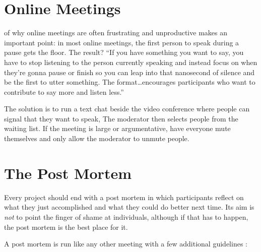 \section{Online Meetings}\label{s:meetings-online}

of why online meetings are often frustrating and unproductive
makes an important point:
in most online meetings,
the first person to speak during a pause gets the floor.
The result?
``If you have something you want to say,
you have to stop listening to the person currently speaking
and instead focus on when they're gonna pause or finish
so you can leap into that nanosecond of silence and be the first to utter something.
The format{\ldots}encourages participants who want to contribute to say more and listen less.''

The solution is to run a text chat beside the video conference
where people can signal that they want to speak,
The moderator then selects people from the waiting list.
If the meeting is large or argumentative,
have everyone mute themselves
and only allow the moderator to unmute people.

\section{The Post Mortem}\label{s:meetings-post-mortem}

Every project should end with a post mortem
in which participants reflect on what they just accomplished
and what they could do better next time.
Its aim is \emph{not} to point the finger of shame at individuals,
although if that has to happen,
the post mortem is the best place for it.

A post mortem is run like any other meeting
with a few additional guidelines \cite{Derb2006}:

